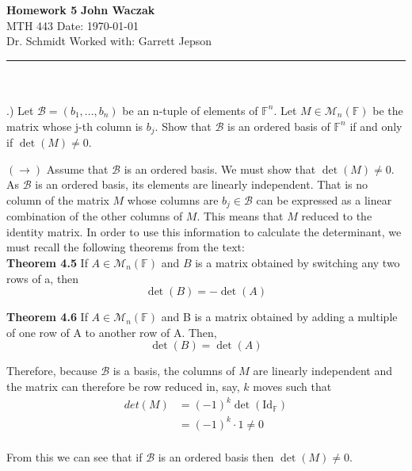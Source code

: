 \documentclass[a4paper, 11pt]{article}
\newcommand{\F}{\mathbb{F}}
\newenvironment{solution}{%
	\begin{list}{}{%
			\setlength{\topsep}{0pt}%
			\setlength{\leftmargin}{1.5cm}%
			\setlength{\rightmargin}{1.5cm}%
			\setlength{\listparindent}{\parindent}%
			\setlength{\itemindent}{\parindent}%
			\setlength{\parsep}{\parskip}%
		}%
		\item[]}{\end{list}}
\begin{document}
\noindent
\large\textbf{Homework 5} \hfill \textbf{John Waczak} \\
\normalsize MTH 443 \hfill  Date: \today \\
Dr. Schmidt \hfill Worked with: Garrett Jepson 
\par\noindent\rule{\textwidth}{0.4pt} \\\\

.) Let $\mathcal{B} = (b_1,...,b_n)$ be an n-tuple of elements of $\F^n$. Let $M\in\mathcal{M}_n(\F)$ be the matrix whose j-th column is $b_j$. Show that $\mathcal{B}$ is an ordered basis of $\F^n$ if and only if $\det(M)\neq 0$.\\

\begin{solution}
  \noindent $(\rightarrow)$ Assume that $\mathcal{B}$ is an ordered basis. We must show that $\det(M)\neq 0$. As $\mathcal{B}$ is an ordered basis, its elements are linearly independent. That is no column of the matrix $M$ whose columns are $b_j\in\mathcal{B}$ can be expressed as a linear combination of the other columns of $M$. This means that $M$ reduced to the identity matrix. In order to use this information to calculate the determinant, we must recall the following theorems from the text:\\

  \noindent \textbf{Theorem 4.5} If $A\in\mathcal{M}_n(\F)$ and $B$ is a matrix obtained by switching any two rows of a, then
  \begin{equation*}
    \det(B) = -\det(A)
  \end{equation*}

  \noindent \textbf{Theorem 4.6} If $A\in\mathcal{M}_n(\F)$ and B is a matrix obtained by adding a multiple of one row of A to another row of A. Then,
  \begin{equation*}
    \det(B) = \det(A)
  \end{equation*}

  \noindent Therefore, because $\mathcal{B}$ is a basis, the columns of $M$ are linearly independent and the matrix can therefore be row reduced in, say, $k$ moves such that
  \begin{align*}
    det(M) &= (-1)^k\det(\text{Id}_\F) \\
    &= (-1)^k\cdot 1 \neq 0 \\ 
  \end{align*}

  \noindent From this we can see that if $\mathcal{B}$ is an ordered basis then $\det(M)\neq 0$. \\


\end{solution}
\end{document}
